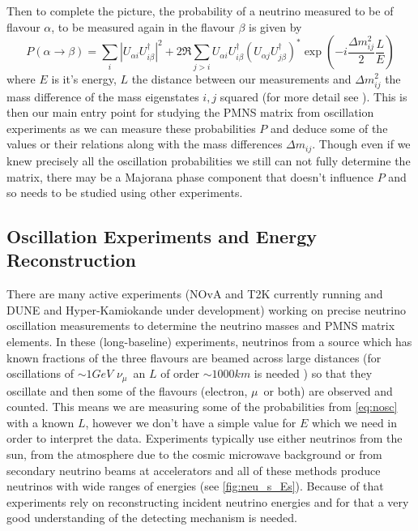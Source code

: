 \documentclass[a4paper,12pt]{article}
\newcommand{\Mu}{$\mu$}
\newcommand{\Nm}{$\nu_\mu$}
\begin{document}
Then to complete the picture, the probability of a neutrino measured to be of flavour $\alpha$, to be measured again in the flavour $\beta$ is given by 
\begin{equation} \label{eq:nosc}
    P(\alpha \rightarrow \beta) = \sum_i |U_{\alpha i} U^\dag_{i \beta}|^2 + 2\Re \sum_{j>i} U_{\alpha i} U^\dag_{i \beta} (U_{\alpha j} U^\dag_{j \beta})^* \exp(-i\frac{\Delta m^2_{ij}}{2}\frac{L}{E})
\end{equation}
where $E$ is it's energy, $L$ the distance between our measurements and $\Delta m^2_{ij}$ the mass difference of the mass eigenstates $i, j$ squared (for more detail see \cite{zuberNeutrinoPhysics2020}).
This is then our main entry point for studying the PMNS matrix from oscillation experiments as we can measure these probabilities $P$ and deduce some of the values or their relations along with the mass differences $\Delta m_{ij}$.
Though even if we  knew precisely all the oscillation probabilities we still can not fully determine the matrix, there may be a Majorana phase component that doesn't influence $P$ and so needs to be studied using other experiments.

\subsection{Oscillation Experiments and Energy Reconstruction}\label{sec:exanderec}
There are many active experiments (NOvA and T2K currently running and DUNE and Hyper-Kamiokande under development) working on precise neutrino oscillation measurements to determine the neutrino masses and PMNS matrix elements.
In these (long-baseline) experiments, neutrinos from a source which has known fractions of the three flavours are beamed across large distances (for oscillations of $\sim 1\si{GeV}$ \Nm\ an $L$ of order $\sim 1000\si{km}$ is needed \cite{mezzettoThreeFlavorOscillationsAccelerator2020}) so that they oscillate and then some of the flavours (electron, \Mu\ or both) are observed and counted.
This means we are measuring some of the probabilities from \cref{eq:nosc} with a known $L$, however we don't have a simple value for $E$ which we need in order to interpret the data.
Experiments typically use either neutrinos from the sun, from the atmosphere due to the cosmic microwave background or from secondary neutrino beams at accelerators and all of these methods produce neutrinos with wide ranges of energies (see \cref{fig:neu_s_Es}).
Because of that experiments rely on reconstructing incident neutrino energies and for that a very good understanding of the detecting mechanism is needed.
\end{document}
